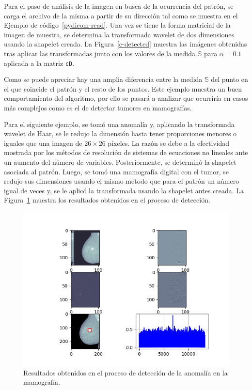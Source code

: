 \par Para el paso de an\'alisis de la imagen en busca de la ocurrencia del patr\'on, se carga el archivo de la misma a partir de su direcci\'on tal como se muestra en el Ejemplo de c\'odigo~\ref{pydicom-read}. Una vez se tiene la forma matricial de la imagen de muestra, se determina la transformada wavelet de dos dimensiones usando la shapelet creada. La Figura~\ref{c-detected} muestra las im\'agenes obtenidas tras aplicar las transformadas junto con los valores de la medida $\mathbb{S}$ para $\alpha=0.1$ aplicada a la matriz \texttt{cD}.

\par Como se puede apreciar hay una amplia diferencia entre la medida $\mathbb{S}$ del punto en el que coincide el patr\'on y el resto de los puntos. Este ejemplo muestra un buen comportamiento del algoritmo, por ello se pasar\'a a analizar que ocurrir\'ia en casos m\'as complejos como es el de detectar tumores en mamograf\'ias.\\

\par Para el siguiente ejemplo, se tom\'o una anomal\'ia y, aplicando la transformada wavelet de Haar, se le redujo la dimensi\'on hasta tener proporciones menores o iguales que una imagen de $26\times 26$ p\'ixeles. La raz\'on se debe a la efectividad mostrada por los m\'etodos de resoluci\'on de sistemas de ecuaciones no lineales ante un aumento del n\'umero de variables. Posteriormente, se determin\'o la shapelet asociada al patr\'on. Luego, se tom\'o una mamograf\'ia digital con el tumor, se redujo sus dimensiones usando el mismo m\'etodo que para el patr\'on un n\'umero igual de veces y, se le aplic\'o la transformada usando la shapelet antes creada. La Figura~\ref{detect-anomalia} muestra los resultados obtenidos en el proceso de detecci\'on.

\begin{figure}[h]
\center
\includegraphics[scale=.7]{Graphics/MamografiaDetect.png}
\caption{Resultados obtenidos en el proceso de detecci\'on de la anomal\'ia en la mamograf\'ia.}
\label{detect-anomalia}
\end{figure}

